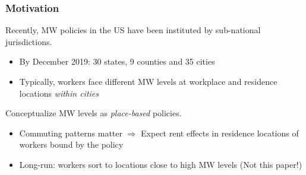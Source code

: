 \documentclass[aspectratio=169, t]{beamer}
\begin{document}
\begin{frame}
    \frametitle{Motivation}
    
    Recently, MW policies in the US have been instituted by sub-national jurisdictions.
    \begin{itemize}
        \item By December 2019: 30 states, 9 counties and 35 cities
        \item Typically, workers face different MW levels at workplace and residence locations \textit{within cities}
    \end{itemize}
    
    \vspace{2mm}
    Conceptualize MW levels as \textit{place-based} policies.
    \begin{itemize}
        \item Commuting patterns matter $\Rightarrow$ Expect rent effects in residence locations 
        of workers bound by the policy
        \item Long-run: workers sort to locations close to high MW levels (Not this paper!)
    \end{itemize}
\end{frame}
\end{document}
